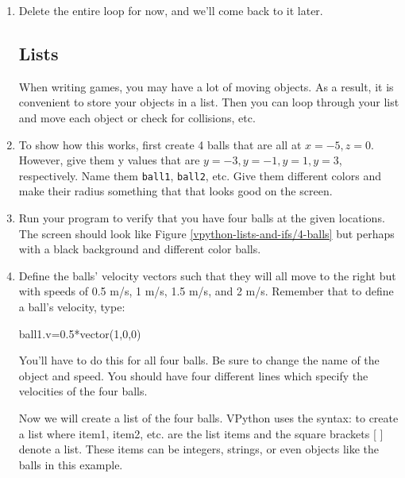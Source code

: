 \begin{enumerate}
{0:  \\

10: \\

1: \\
}

\item Delete the entire  loop for now, and we'll come back to it later.

\subsection*{Lists}

When writing games, you may have a lot of moving objects. As a result, it is convenient to store your objects in a list. Then you can loop through your list and move each object or check for collisions, etc.

\item To show how this works, first create 4 balls that are all at $x=-5, z=0$. However, give them y values that are $y=-3, y=-1, y=1, y=3$, respectively. Name them \texttt{ball1}, \texttt{ball2}, etc. Give them different colors and make their radius something that that looks good on the screen. 

\item Run your program to verify that you have four balls at the given locations. The screen should look like Figure \ref{vpython-lists-and-ifs/4-balls} but perhaps with a black background and different color balls.


\item Define the balls' velocity vectors such that they will all move to the right but with speeds of 0.5 m/s, 1 m/s, 1.5 m/s, and 2 m/s. Remember that to define a ball's velocity, type:

\begin{myvpython}
ball1.v=0.5*vector(1,0,0)
\end{myvpython}

You'll have to do this for all four balls. Be sure to change the name of the object and speed. You should have four different lines which specify the velocities of the four balls.

Now we will create a list of the four balls. VPython uses the syntax:  to create a list where item1, item2, etc. are the list items and the square brackets [ ] denote a list. These items can be integers, strings, or even objects like the balls in this example.


\end{enumerate}
